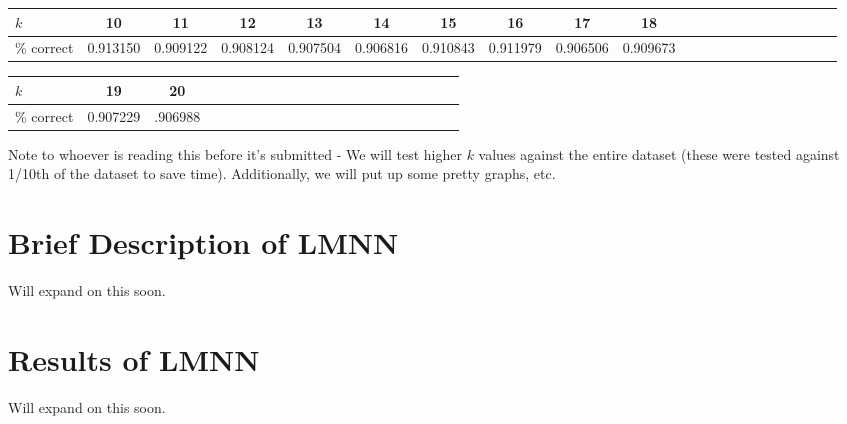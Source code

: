 \documentclass[11pt]{article}
\begin{document}
\begin{flushleft}
  \begin{tabular}{ l | c | c | c | c | c | c | c | c | c | c | c | c | c | c | c | c | c | c | c | r }
    \hline
    $k$ & 10 & 11 & 12 & 13 & 14 & 15 & 16 & 17 & 18 \\ \hline
    \% correct & 0.913150 &  0.909122 & 0.908124 & 0.907504 & 0.906816 & 0.910843 & 0.911979 &  0.906506 & 0.909673 \\
    \hline
  \end{tabular}
\end{flushleft}

\begin{center}
  \begin{tabular}{ l | c | c | c | c | c | c | c | c | c | c | c | c | c | c | c | c | c | c | c | r }
    \hline
    $k$ & 19 & 20 \\ \hline
    \% correct  & 0.907229 & .906988 \\
    \hline
  \end{tabular}
\end{center}
Note to whoever is reading this before it's submitted - We will test higher $k$ values against the entire dataset (these were tested against 1/10th of the dataset to save time). Additionally, we will put up some pretty graphs, etc.
\section{Brief Description of LMNN}
Will expand on this soon.
\section{Results of LMNN}
Will expand on this soon.
\end{document}

